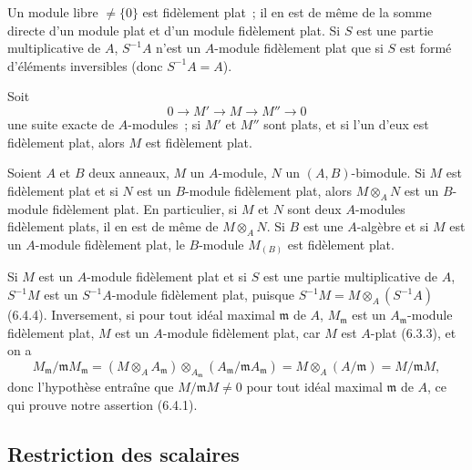 
\begin{env}[6.4.2]
\label{0.6.4.2-fr}
Un module libre $\neq\{0\}$ est fidèlement plat~; il en est de même de la
somme directe d'un module plat et d'un module fidèlement plat. Si $S$ est
une partie multiplicative de $A$, $S^{-1}A$ n'est un $A$-module fidèlement
plat que si $S$ est formé d'éléments inversibles (donc $S^{-1}A=A$).
\end{env}

\begin{env}[6.4.3]
\label{0.6.4.3-fr}
Soit
\[
  0\longrightarrow M'\longrightarrow M\longrightarrow M''\longrightarrow 0
\]
une suite exacte de $A$-modules~; si $M'$ et $M''$ sont plats, et si l'un
d'eux est fidèlement plat, alors $M$ est fidèlement plat.
\end{env}

\begin{env}[6.4.4]
\label{0.6.4.4-fr}
Soient $A$ et $B$ deux anneaux, $M$ un $A$-module, $N$ un
$(A,B)$-bimodule. Si $M$ est fidèlement plat et si $N$ est un $B$-module
fidèlement plat, alors $M\otimes_A N$ est un $B$-module fidèlement plat. En
particulier, si $M$ et $N$ sont deux $A$-modules fidèlement plats, il en est
de même de $M\otimes_A N$. Si $B$ est une $A$-algèbre et si $M$ est un
$A$-module fidèlement plat, le $B$-module $M_{(B)}$ est fidèlement plat.
\end{env}

\begin{env}[6.4.5]
\label{0.6.4.5-fr}
Si $M$ est un $A$-module fidèlement plat et si $S$ est une partie
multiplicative de $A$, $S^{-1}M$ est un $S^{-1}A$-module fidèlement plat,
puisque $S^{-1}M=M\otimes_A(S^{-1}A)$ (6.4.4). Inversement, si pour tout
idéal maximal $\mathfrak{m}$ de $A$, $M_\mathfrak{m}$ est un
$A_\mathfrak{m}$-module fidèlement plat, $M$ est un $A$-module fidèlement
plat, car $M$ est $A$-plat (6.3.3), et on a
\[
  M_\mathfrak{m}/\mathfrak{m}M_\mathfrak{m}
  =(M\otimes_A A_\mathfrak{m})
  \otimes_{A_\mathfrak{m}}
  (A_\mathfrak{m}/\mathfrak{m}A_\mathfrak{m})
  =M\otimes_A(A/\mathfrak{m})
  =M/\mathfrak{m}M,
\]
donc l'hypothèse entraîne que $M/\mathfrak{m}M\neq0$ pour tout idéal
maximal $\mathfrak{m}$ de $A$, ce qui prouve notre assertion (6.4.1).
\end{env}

\subsection{Restriction des scalaires}
\label{subsection:0.6.5-fr}

